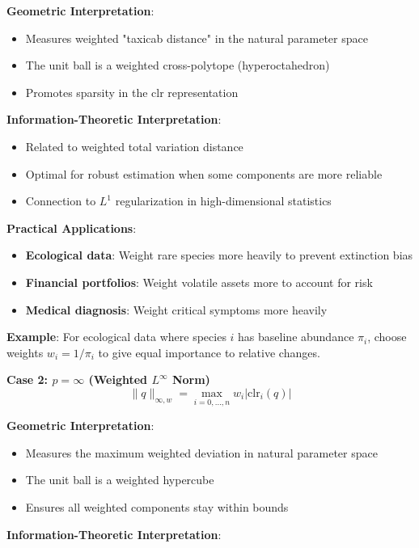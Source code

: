 \documentclass{amsart}
\theoremstyle{plain}
\theoremstyle{definition}
\theoremstyle{remark}
\begin{document}
\textbf{Geometric Interpretation}:

\begin{itemize}
	\item Measures weighted "taxicab distance" in the natural parameter space
	\item The unit ball is a weighted cross-polytope (hyperoctahedron)
	\item Promotes sparsity in the clr representation
\end{itemize}

\textbf{Information-Theoretic Interpretation}:

\begin{itemize}
	\item Related to weighted total variation distance
	\item Optimal for robust estimation when some components are more reliable
	\item Connection to $L^1$ regularization in high-dimensional statistics
\end{itemize}

\textbf{Practical Applications}:

\begin{itemize}
	\item \textbf{Ecological data}: Weight rare species more heavily to prevent extinction bias
	\item \textbf{Financial portfolios}: Weight volatile assets more to account for risk
	\item \textbf{Medical diagnosis}: Weight critical symptoms more heavily
\end{itemize}

\textbf{Example}: For ecological data where species $i$ has baseline abundance $\pi_i$, choose weights $w_i = 1/\pi_i$ to give equal importance to relative changes.

\textbf{Case 2: $p = \infty$ (Weighted $L^\infty$ Norm)}
\[
\|q\|_{\infty,w} = \max_{i=0,\ldots,n} w_i |\text{clr}_i(q)|
\]

\textbf{Geometric Interpretation}:

\begin{itemize}
	\item Measures the maximum weighted deviation in natural parameter space
	\item The unit ball is a weighted hypercube
	\item Ensures all weighted components stay within bounds
\end{itemize}

\textbf{Information-Theoretic Interpretation}:
\end{document}
